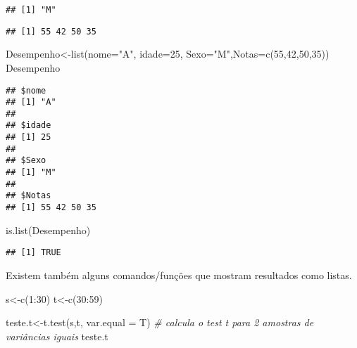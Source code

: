 \documentclass[
]{book}
\newenvironment{Shaded}{\begin{snugshade}}{\end{snugshade}}
\newcommand{\AttributeTok}[1]{\textcolor[rgb]{0.77,0.63,0.00}{#1}}
\newcommand{\CommentTok}[1]{\textcolor[rgb]{0.56,0.35,0.01}{\textit{#1}}}
\newcommand{\DecValTok}[1]{\textcolor[rgb]{0.00,0.00,0.81}{#1}}
\newcommand{\FunctionTok}[1]{\textcolor[rgb]{0.00,0.00,0.00}{#1}}
\newcommand{\NormalTok}[1]{#1}
\newcommand{\OtherTok}[1]{\textcolor[rgb]{0.56,0.35,0.01}{#1}}
\newcommand{\SpecialCharTok}[1]{\textcolor[rgb]{0.00,0.00,0.00}{#1}}
\newcommand{\StringTok}[1]{\textcolor[rgb]{0.31,0.60,0.02}{#1}}
\begin{document}
\begin{verbatim}
## [1] "M"
\end{verbatim}

\begin{verbatim}
## [1] 55 42 50 35
\end{verbatim}

\begin{Shaded}
\begin{Highlighting}[]
\NormalTok{Desempenho}\OtherTok{\textless{}{-}}\FunctionTok{list}\NormalTok{(}\AttributeTok{nome=}\StringTok{"A"}\NormalTok{, }\AttributeTok{idade=}\DecValTok{25}\NormalTok{, }\AttributeTok{Sexo=}\StringTok{"M"}\NormalTok{,}\AttributeTok{Notas=}\FunctionTok{c}\NormalTok{(}\DecValTok{55}\NormalTok{,}\DecValTok{42}\NormalTok{,}\DecValTok{50}\NormalTok{,}\DecValTok{35}\NormalTok{))}
\NormalTok{Desempenho}
\end{Highlighting}
\end{Shaded}

\begin{verbatim}
## $nome
## [1] "A"
## 
## $idade
## [1] 25
## 
## $Sexo
## [1] "M"
## 
## $Notas
## [1] 55 42 50 35
\end{verbatim}

\begin{Shaded}
\begin{Highlighting}[]
\FunctionTok{is.list}\NormalTok{(Desempenho)}
\end{Highlighting}
\end{Shaded}

\begin{verbatim}
## [1] TRUE
\end{verbatim}

Existem também alguns comandos/funções que mostram resultados como listas.

\begin{Shaded}
\begin{Highlighting}[]
\NormalTok{s}\OtherTok{\textless{}{-}}\FunctionTok{c}\NormalTok{(}\DecValTok{1}\SpecialCharTok{:}\DecValTok{30}\NormalTok{)}
\NormalTok{t}\OtherTok{\textless{}{-}}\FunctionTok{c}\NormalTok{(}\DecValTok{30}\SpecialCharTok{:}\DecValTok{59}\NormalTok{)}

\NormalTok{teste.t}\OtherTok{\textless{}{-}}\FunctionTok{t.test}\NormalTok{(s,t, }\AttributeTok{var.equal =}\NormalTok{ T) }\CommentTok{\# calcula o test t para 2 amostras de variâncias iguais}
\NormalTok{teste.t}
\end{Highlighting}
\end{Shaded}
\end{document}
